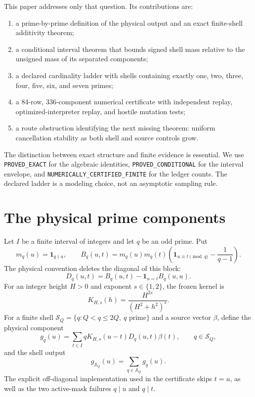 \documentclass[11pt]{article}
\newcommand{\1}{\mathbf{1}}
\newcommand{\shell}{\mathcal S}
\begin{document}
This paper addresses only that question.  Its contributions are:

\begin{enumerate}[leftmargin=1.8em,itemsep=2pt]
  \item a prime-by-prime definition of the physical output and an exact
        finite-shell additivity theorem;
  \item a conditional interval theorem that bounds signed shell mass relative
        to the unsigned mass of its separated components;
  \item a declared cardinality ladder with shells containing exactly one,
        two, three, four, five, six, and seven primes;
  \item a 84-row, 336-component numerical certificate with independent
        replay, optimized-interpreter replay, and hostile mutation tests;
  \item a route obstruction identifying the next missing theorem: uniform
        cancellation stability as both shell and source controls grow.
\end{enumerate}

The distinction between exact structure and finite evidence is essential.  We
use \texttt{PROVED\_EXACT} for the algebraic identities,
\texttt{PROVED\_CONDITIONAL} for the interval envelope, and
\texttt{NUMERICALLY\_CERTIFIED\_FINITE} for the ledger counts.  The declared
ladder is a modeling choice, not an asymptotic sampling rule.

\section{The physical prime components}

Let $I$ be a finite interval of integers and let $q$ be an odd prime.  Put
\begin{equation}
 m_q(u)=\1_{q\nmid u},\qquad
 B_q(u,t)=m_q(u)m_q(t)
 \left(\1_{u\equiv t\pmod q}-\frac{1}{q-1}\right).
 \label{eq:block}
\end{equation}
The physical convention deletes the diagonal of this block:
\begin{equation}
 D_q(u,t)=B_q(u,t)-\1_{u=t}B_q(u,u).
 \label{eq:deleted}
\end{equation}
For an integer height $H>0$ and exponent $s\in\{1,2\}$, the frozen kernel is
\begin{equation}
 K_{H,s}(h)=\frac{H^{2s}}{(H^2+h^2)^s}.
 \label{eq:kernel}
\end{equation}
For a finite shell $\shell_Q=\{q:Q<q\leq 2Q,\ q\text{ prime}\}$ and a
source vector $\beta$, define the physical component
\begin{equation}
 g_q(u)=\sum_{t\in I}qK_{H,s}(u-t)D_q(u,t)\beta(t),
 \qquad q\in\shell_Q,
 \label{eq:component}
\end{equation}
and the shell output
\begin{equation}
 g_{\shell_Q}(u)=\sum_{q\in\shell_Q}g_q(u).
 \label{eq:shell}
\end{equation}
The explicit off-diagonal implementation used in the certificate skips
$t=u$, as well as the two active-mask failures $q\mid u$ and $q\mid t$.
\end{document}
